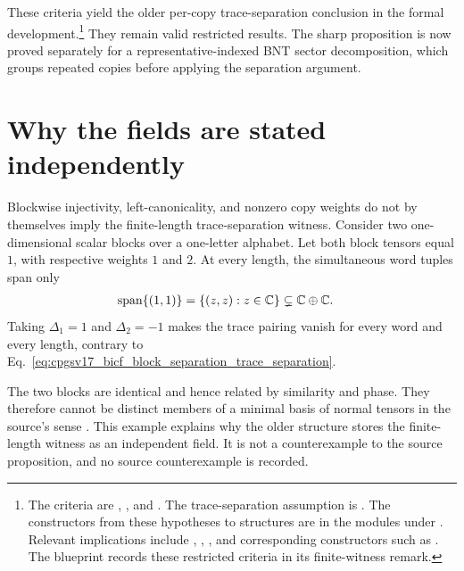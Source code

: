 \documentclass{article}
\begin{document}
These criteria yield the older per-copy trace-separation conclusion in the
formal development.\footnote{The criteria are
    , , and
    . The trace-separation assumption is
    . The constructors from these hypotheses to
     structures are in the modules under
    . Relevant implications include
    ,
    ,
    , and corresponding
     constructors such as
    . The blueprint records
    these restricted criteria in its finite-witness remark.}
They remain valid restricted results. The sharp proposition is now proved
separately for a representative-indexed BNT sector decomposition, which groups
repeated copies before applying the separation argument.

\section{Why the fields are stated independently}

Blockwise injectivity, left-canonicality, and nonzero copy weights do not by
themselves imply the finite-length trace-separation witness. Consider two
one-dimensional scalar blocks over a one-letter alphabet. Let both block
tensors equal $1$, with respective weights $1$ and $2$. At every length, the
simultaneous word tuples span only
\begin{align}
    \operatorname{span}\{(1,1)\}
        &= \left\{(z,z):z\in\mathbb{C}\right\}
        \subsetneq \mathbb{C}\oplus\mathbb{C}.
    \label{eq:cpgsv17_bicf_block_separation_identical_block_diagonal_span}
\end{align}
Taking $\Delta_1=1$ and $\Delta_2=-1$ makes the trace pairing vanish for every
word and every length, contrary to
Eq.~\ref{eq:cpgsv17_bicf_block_separation_trace_separation}.

The two blocks are identical and hence related by similarity and phase. They
therefore cannot be distinct members of a minimal basis of normal tensors in
the source's sense \cite{Cirac2016MPDO_arXiv}. This example explains why the
older structure stores the finite-length witness as an independent field. It
is not a counterexample to the source proposition, and no source
counterexample is recorded.
\end{document}
